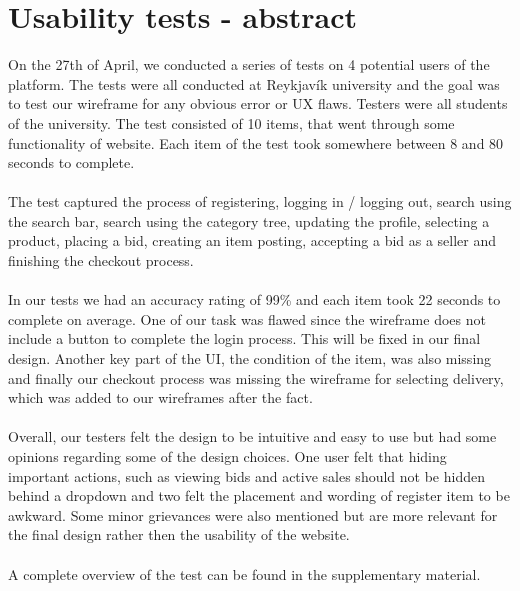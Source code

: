 \section{Usability tests - abstract}
On the 27th of April, we conducted a series of tests on 4 potential users of the platform. The tests were all conducted at Reykjavík university and the goal was to test our wireframe for any obvious error or UX flaws. Testers were all students of the university.
The test consisted of 10 items, that went through some functionality of website. Each item of the test took somewhere between 8 and 80 seconds to complete.\\\\
The test captured the process of registering, logging in / logging out, search using the search bar, search using the category tree, updating the profile, selecting a product, placing a bid, creating an item posting, accepting a bid as a seller and finishing the checkout process. \\\\
In our tests we had an accuracy rating of 99\% and each item took 22 seconds to complete on average. One of our task was flawed since the wireframe does not include a button to complete the login process. This will be fixed in our final design. Another key part of the UI, the condition of the item, was also missing and finally our checkout process was missing the wireframe for selecting delivery, which was added to our wireframes after the fact.\\\\
Overall, our testers felt the design to be intuitive and easy to use but had some opinions regarding some of the design choices. One user felt that hiding important actions, such as viewing bids and active sales should not be hidden behind a dropdown and two felt the placement and wording of register item to be awkward. Some minor grievances were also mentioned but are more relevant for the final design rather then the usability of the website. \\\\
A complete overview of the test can be found in the supplementary material. 
